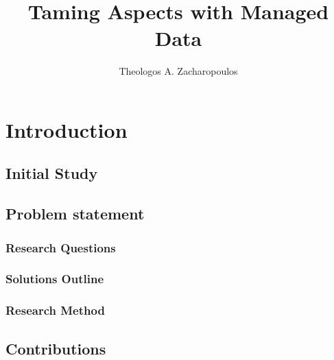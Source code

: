 \documentclass{uvamscse}
\title{Taming Aspects with Managed Data }
\author{Theologos A. Zacharopoulos}
\begin{document}
\maketitle

\chapter{Introduction}\label{Introduction}

\section{Initial Study}\label{Initial Study}

\section{Problem statement}\label{Problem statement}

\subsection{Research Questions}\label{Research Questions}

\subsection{Solutions Outline}\label{Solutions Outline}

\subsection{Research Method}\label{Research Method}

\section{Contributions}\label{Contributions}
\end{document}
